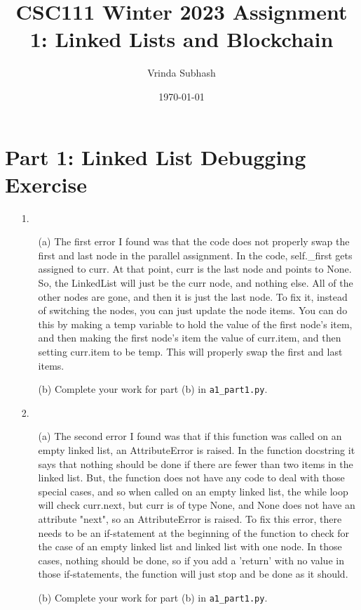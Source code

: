 \documentclass[11pt]{article}
\title{CSC111 Winter 2023 Assignment 1: Linked Lists and Blockchain}
\author{Vrinda Subhash}
\date{\today}
\begin{document}
\maketitle

\section*{Part 1: Linked List Debugging Exercise}

\begin{enumerate}
\item[1.]
\begin{enumerate}
    \item[(a)]
    The first error I found was that the code does not properly swap the first and last node in the parallel assignment. In the code, self.\_first gets assigned to curr. At that point, curr is the last node and points to None. So, the LinkedList will just be the curr node, and nothing else. All of the other nodes are gone, and then it is just the last node. To fix it, instead of switching the nodes, you can just update the node items. You can do this by making a temp variable to hold the value of the first node's item, and then making the first node's item the value of curr.item, and then setting curr.item to be temp. This will properly swap the first and last items.
    \item[(b)]
    Complete your work for part (b) in \texttt{a1\_part1.py}.
\end{enumerate}

\item[2.]
\begin{enumerate}
    \item[(a)]
    The second error I found was that if this function was called on an empty linked list, an AttributeError is raised. In the function docstring it says that nothing should be done if there are fewer than two items in the linked list. But, the function does not have any code to deal with those special cases, and so when called on an empty linked list, the while loop will check curr.next, but curr is of type None, and None does not have an attribute "next", so an AttributeError is raised. To fix this error, there needs to be an if-statement at the beginning of the function to check for the case of an empty linked list and linked list with one node. In those cases, nothing should be done, so if you add a 'return' with no value in those if-statements, the function will just stop and be done as it should.
    \item[(b)]
    Complete your work for part (b) in \texttt{a1\_part1.py}.
\end{enumerate}


\end{enumerate}
\end{document}
